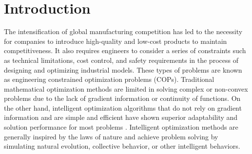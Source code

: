 \documentclass[preprint,review,compress,12pt]{elsarticle}
\begin{document}

\section{Introduction}
\label{}

The intensification of global manufacturing competition has led to the necessity for companies to introduce high-quality and low-cost products to maintain competitiveness. It also requires engineers to consider a series of constraints such as technical limitations, cost control, and safety requirements in the process of designing and optimizing industrial models. These types of problems are known as engineering constrained optimization problems (COPs). Traditional mathematical optimization methods \cite{treanctua2022robust, ragsdell1976optimal} are limited in solving complex or non-convex problems due to the lack of gradient information or continuity of functions. On the other hand, intelligent optimization algorithms that do not rely on gradient information and are simple and efficient have shown superior adaptability and solution performance for most problems \cite{garg2016hybrid}. Intelligent optimization methods are generally inspired by the laws of nature and achieve problem solving by simulating natural evolution, collective behavior, or other intelligent behaviors.
\end{document}
